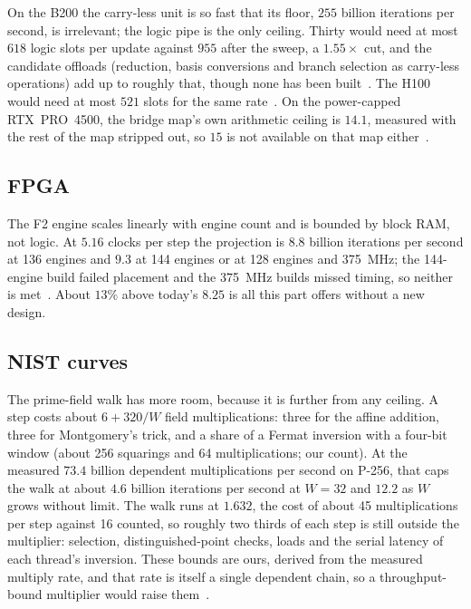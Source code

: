 On the B200 the carry-less unit is so fast that its floor, $255$ billion
iterations per second, is irrelevant; the logic pipe is the only
ceiling. Thirty would need at most $618$ logic slots per update against
$955$ after the sweep, a $1.55\times$ cut, and the candidate offloads
(reduction, basis conversions and branch selection as carry-less
operations) add up to roughly that, though none has been
built~.
The H100 would need at most $521$ slots for the same
rate~. On the power-capped RTX~PRO~4500,
the bridge map's own arithmetic ceiling is $14.1$, measured with the
rest of the map stripped out, so $15$ is not available on that map
either~.

\subsection{FPGA}
\label{sec:bounds-fpga}

The F2 engine scales linearly with engine count and is bounded by block
RAM, not logic. At $5.16$ clocks per step the projection is $8.8$ billion
iterations per second at 136 engines and $9.3$ at 144 engines or at 128
engines and 375~MHz; the 144-engine build failed placement and the
375~MHz builds missed timing, so neither is met~.
About $13\%$ above today's $8.25$ is all this part offers without a new
design.

\subsection{NIST curves}
\label{sec:bounds-nist}

The prime-field walk has more room, because it is further from any
ceiling. A step costs about $6 + 320/W$ field multiplications: three for
the affine addition, three for Montgomery's trick, and a share of a
Fermat inversion with a four-bit window (about 256 squarings and 64
multiplications; our count). At the measured $73.4$ billion dependent
multiplications per second on P-256, that caps the walk at about $4.6$
billion iterations per second at $W=32$ and $12.2$ as $W$ grows without
limit. The walk runs at $1.632$, the cost of about 45 multiplications per
step against 16 counted, so roughly two thirds of each step is still
outside the multiplier: selection, distinguished-point checks, loads and
the serial latency of each thread's inversion. These bounds are ours,
derived from the measured multiply rate, and that rate is itself a
single dependent chain, so a throughput-bound multiplier would raise
them~.

